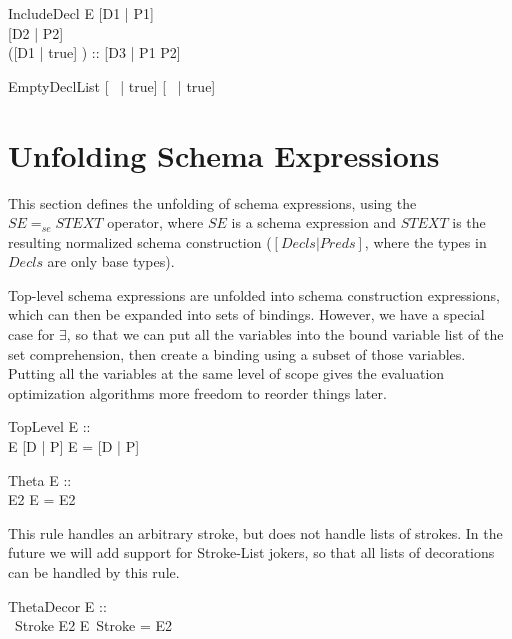 \documentclass{article}
\newcommand{\sexprUnfoldsTo}{\mathrel{=_{se}}}
\newcommand{\declListUnfoldsTo}{\mathrel{=_d}}
\begin{document}
\begin{zedrule}{IncludeDecl}
   E \sexprUnfoldsTo [D1 | P1] \\
   [D | true] \declListUnfoldsTo [D2 | P2] \\
   ([D1 | true] \land [D2 | true]) :: \power [D3 | true] 
\derives
   [E; D | true] \declListUnfoldsTo [D3 |  P1 \land P2]
\end{zedrule}

\begin{zedrule}{EmptyDeclList}
   [~ | true] \declListUnfoldsTo [~ | true]
\end{zedrule}


\section{Unfolding Schema Expressions}

This section defines the unfolding of schema expressions,
using the $SE \sexprUnfoldsTo STEXT$ operator, where $SE$
is a schema expression and $STEXT$ is the resulting normalized
schema construction ($[Decls|Preds]$, where the types in $Decls$
are only base types).

Top-level schema expressions are unfolded into schema construction
expressions, which can then be expanded into sets of bindings.
However, we have a special case for $\exists$, so that we can
put all the variables into the bound variable list of the
set comprehension, then create a binding using a subset of
those variables.  Putting all the variables at the same level
of scope gives the evaluation optimization algorithms more
freedom to reorder things later.

\begin{zedrule}{TopLevel}
  E :: \power [D2 | true] \\
  E  \sexprUnfoldsTo [D | P]
\derives
  E = [D | P]
\end{zedrule}

\begin{zedrule}{Theta}
  E :: \power [D | true] \\
  \theta [D | true] \is E2
\derives
  \theta E = E2
\end{zedrule}

This rule handles an arbitrary stroke, but does not handle
lists of strokes.  In the future we will add
support for Stroke-List jokers, so that all lists of
decorations can be handled by this rule.

\begin{zedrule}{ThetaDecor}
  E :: \power [D | true] \\
  \theta [D | true]~Stroke \is E2
\derives
  \theta E~Stroke = E2
\end{zedrule}
\end{document}
